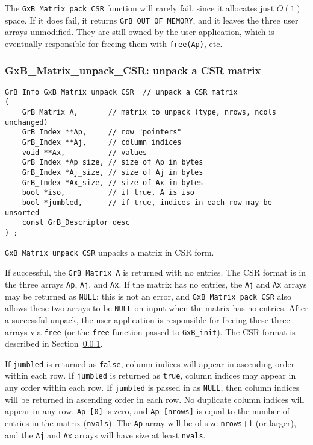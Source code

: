 \documentclass[12pt]{article}
\begin{document}
The \verb'GxB_Matrix_pack_CSR' function will rarely fail, since it allocates
just $O(1)$ space.  If it does fail, it returns \verb'GrB_OUT_OF_MEMORY',
and it leaves the three user arrays unmodified.  They are still owned by
the user application, which is eventually responsible for freeing them with
\verb'free(Ap)', etc.

\newpage
\subsubsection{{\sf GxB\_Matrix\_unpack\_CSR:} unpack a CSR matrix}
\label{matrix_unpack_csr}

\begin{mdframed}[userdefinedwidth=6in]
{\footnotesize
\begin{verbatim}
GrB_Info GxB_Matrix_unpack_CSR  // unpack a CSR matrix
(
    GrB_Matrix A,       // matrix to unpack (type, nrows, ncols unchanged)
    GrB_Index **Ap,     // row "pointers"
    GrB_Index **Aj,     // column indices
    void **Ax,          // values
    GrB_Index *Ap_size, // size of Ap in bytes
    GrB_Index *Aj_size, // size of Aj in bytes
    GrB_Index *Ax_size, // size of Ax in bytes
    bool *iso,          // if true, A is iso
    bool *jumbled,      // if true, indices in each row may be unsorted
    const GrB_Descriptor desc
) ;
\end{verbatim}
} \end{mdframed}

\verb'GxB_Matrix_unpack_CSR' unpacks a matrix in CSR form.

If successful, the \verb'GrB_Matrix A' is returned with no entries.
The CSR format is in the three arrays
\verb'Ap', \verb'Aj', and \verb'Ax'.  If the matrix has no entries, the
\verb'Aj' and \verb'Ax' arrays may be returned as \verb'NULL'; this is not an
error, and \verb'GxB_Matrix_pack_CSR' also allows these two arrays to be
\verb'NULL' on input when the matrix has no entries.  After a successful
unpack, the user application is responsible for freeing these three arrays via
\verb'free' (or the \verb'free' function passed to \verb'GxB_init').  The CSR
format is described in Section~\ref{matrix_unpack_csr}.

If \verb'jumbled' is returned as \verb'false', column indices will appear in
ascending order within each row.  If \verb'jumbled' is returned as \verb'true',
column indices may appear in any order within each row.  If \verb'jumbled' is
passed in as \verb'NULL', then column indices will be returned in ascending
order in each row.  No duplicate column indices will appear in any row.
\verb'Ap [0]' is zero, and \verb'Ap [nrows]' is equal to the number of entries
in the matrix (\verb'nvals').  The \verb'Ap' array will be of size
\verb'nrows'+1 (or larger), and the \verb'Aj' and \verb'Ax' arrays will have
size at least \verb'nvals'.
\end{document}
